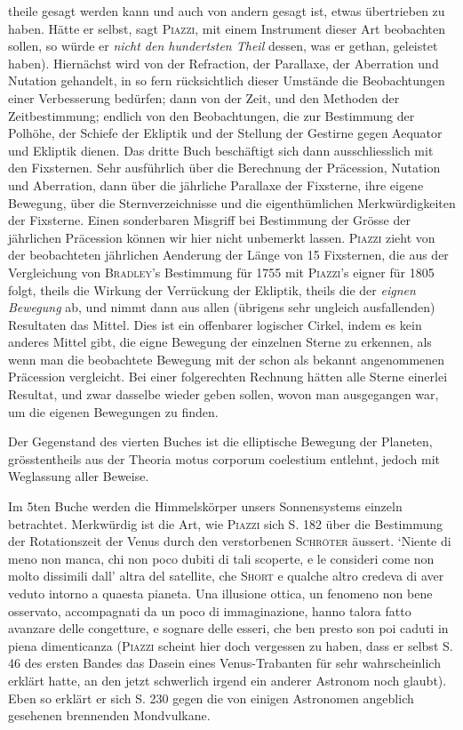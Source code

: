 \noindent theile gesagt werden kann und auch von andern gesagt ist, etwas übertrieben zu haben. Hätte er selbst, sagt \textsc{Piazzi}, mit einem Instrument dieser Art beobachten sollen, so würde er \emph{nicht den hundertsten Theil} dessen, was er gethan, geleistet haben). Hiernächst wird von der Refraction, der Parallaxe, der Aberration und Nutation gehandelt, in so fern rücksichtlich dieser Umstände die Beobachtungen einer Verbesserung bedürfen; dann von der Zeit, und den Methoden der Zeitbestimmung; endlich von den Beobachtungen, die zur Bestimmung der Polhöhe, der Schiefe der Ekliptik und der Stellung der Gestirne gegen Aequator und Ekliptik dienen. Das dritte Buch beschäftigt sich dann ausschliesslich mit den Fixsternen. Sehr ausführlich über die Berechnung der Präcession, Nutation und Aberration, dann über die jährliche Parallaxe der Fixsterne, ihre eigene Bewegung, über die Sternverzeichnisse und die eigenthümlichen Merkwürdigkeiten der Fixsterne. Einen sonderbaren Misgriff bei Bestimmung der Grösse der jährlichen Präcession können wir hier nicht unbemerkt lassen. \textsc{Piazzi} zieht von der beobachteten jährlichen Aenderung der Länge von 15 Fixsternen, die aus der Vergleichung von \textsc{Bradley}'s Bestimmung für 1755 mit \textsc{Piazzi}'s eigner für 1805 folgt, theils die Wirkung der Verrückung der Ekliptik, theils die der \emph{eignen Bewegung} ab, und nimmt dann aus allen (übrigens sehr ungleich ausfallenden) Resultaten das Mittel. Dies ist ein offenbarer logischer Cirkel, indem es kein anderes Mittel gibt, die eigne Bewegung der einzelnen Sterne zu erkennen, als wenn man die beobachtete Bewegung mit der schon als bekannt angenommenen Präcession vergleicht. Bei einer folgerechten Rechnung hätten alle Sterne einerlei Resultat, und zwar dasselbe wieder geben sollen, wovon man ausgegangen war, um die eigenen Bewegungen zu finden.

Der Gegenstand des vierten Buches ist die elliptische Bewegung der Planeten, grösstentheils aus der Theoria motus corporum coelestium entlehnt, jedoch mit Weglassung aller Beweise.

Im 5ten Buche werden die Himmelskörper unsers Sonnensystems einzeln betrachtet. Merkwürdig ist die Art, wie \textsc{Piazzi} sich S. 182 über die Bestimmung der Rotationszeit der Venus durch den verstorbenen \textsc{Schröter} äussert. `Niente di meno non manca, chi non poco dubiti di tali scoperte, e le consideri come non molto dissimili dall' altra del satellite, che \textsc{Short} e qualche altro credeva di aver veduto intorno a quaesta pianeta. Una illusione ottica, un fenomeno non bene osservato, accompagnati da un poco di immaginazione, hanno talora fatto avanzare delle congetture, e sognare delle esseri, che ben presto son poi caduti in piena dimenticanza (\textsc{Piazzi} scheint hier doch vergessen zu haben, dass er selbst S. 46 des ersten Bandes das Dasein eines Venus-Trabanten für sehr wahrscheinlich erklärt hatte, an den jetzt schwerlich irgend ein anderer Astronom noch glaubt). Eben so erklärt er sich S. 230 gegen die von einigen Astronomen angeblich gesehenen brennenden Mondvulkane.

